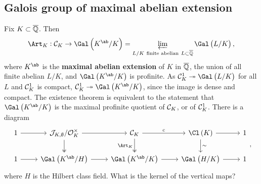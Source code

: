 \subsection{Galois group of maximal abelian extension}

Fix $ K \subset \overline{\mathbb{Q}} $. Then
$$ \Art_K : \CCC_K \to \Gal\br{K^{\ab} / K} = \varprojlim_{L / K \ \text{finite abelian} \ L \subset \overline{\QQ}} \Gal\br{L / K}, $$
where $ K^{\ab} $ is the \textbf{maximal abelian extension} of $ K $ in $ \overline{\mathbb{Q}} $, the union of all finite abelian $ L / K $, and $ \Gal\br{K^{\ab} / K} $ is profinite. As $ \CCC_K^1 \twoheadrightarrow \Gal\br{L / K} $ for all $ L $ and $ \mathcal{C}_K^1 $ is compact, $ \CCC_K^1 \twoheadrightarrow \Gal\br{K^{\ab} / K} $, since the image is dense and compact. The existence theorem is equivalent to the statement that $ \Gal\br{K^{\ab} / K} $ is the maximal profinite quotient of $ \mathcal{C}_K $, or of $ \mathcal{C}_K^1 $. There is a diagram
$$
\begin{tikzcd}
1 \arrow{r} & \JJJ_{K, \emptyset} / \OOO_K^\times \arrow{r} \arrow[twoheadrightarrow]{d} & \CCC_K \arrow{r}{\c} \arrow[twoheadrightarrow]{d}[swap]{\Art_K} & \Cl\br{K} \arrow{r} \arrow{d}{\sim} & 1 \\
1 \arrow{r} & \Gal\br{K^{\ab} / H} \arrow{r} & \Gal\br{K^{\ab} / K} \arrow{r} & \Gal\br{H / K} \arrow{r} & 1
\end{tikzcd},
$$
where $ H $ is the Hilbert class field. What is the kernel of the vertical maps?

